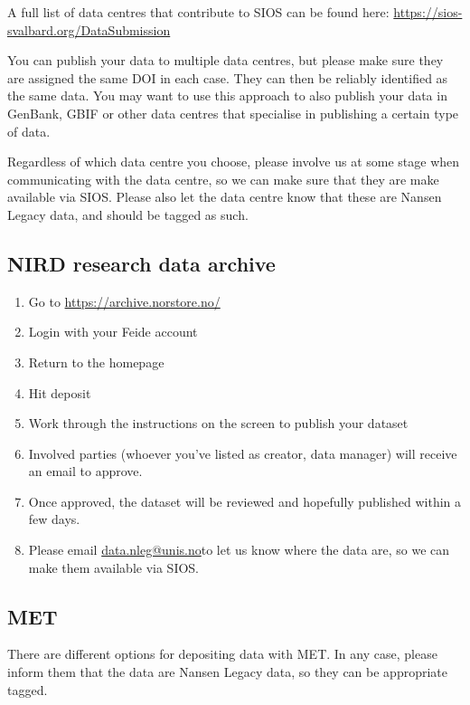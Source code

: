 \documentclass[a4paper,english, 11pt]{article}
\makeatletter
\newcommand{\emailme}{\href{mailto:data.nleg@unis.no}{data.nleg@unis.no}}
\makeatother
\begin{document}
A full list of data centres that contribute to SIOS can be found here: \url{https://sios-svalbard.org/DataSubmission}

You can publish your data to multiple data centres, but please make sure they are assigned the same DOI in each case. They can then be reliably identified as the same data. You may want to use this approach to also publish your data in GenBank, GBIF or other data centres that specialise in publishing a certain type of data.

Regardless of which data centre you choose, please involve us at some stage when communicating with the data centre, so we can make sure that they are make available via SIOS. Please also let the data centre know that these are Nansen Legacy data, and should be tagged as such.

\subsection{NIRD research data archive}
\label{ss:NIRD}

\begin{enumerate}
\item Go to \url{https://archive.norstore.no/}
\item Login with your Feide account
\item Return to the homepage
\item Hit deposit
\item Work through the instructions on the screen to publish your dataset
\item Involved parties (whoever you've listed as creator, data manager) will receive an email to approve.
\item Once approved, the dataset will be reviewed and hopefully published within a few days.
\item Please email \emailme to let us know where the data are, so we can make them available via SIOS.
\end{enumerate}

\subsection{MET}
\label{ss:MET}

There are different options for depositing data with MET. In any case, please inform them that the data are Nansen Legacy data, so they can be appropriate tagged.
\end{document}
